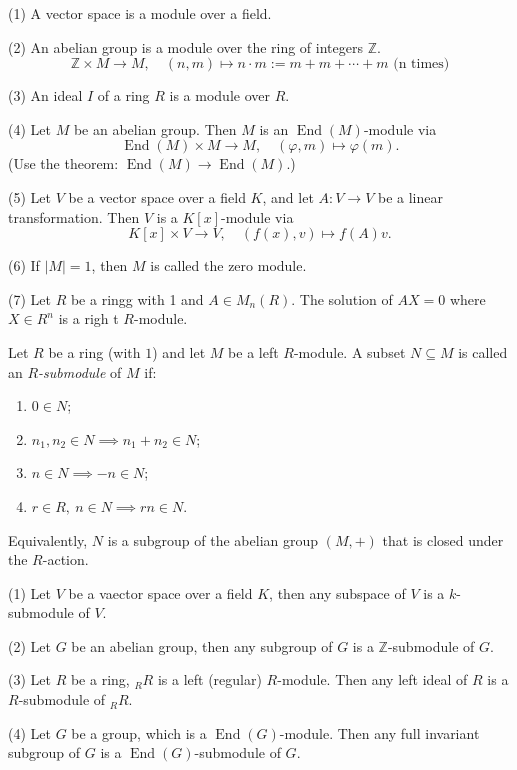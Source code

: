 \documentclass[11pt, a4paper]{report}
\begin{document}
\begin{example}
(1) A vector space is a module over a field.

(2) An abelian group is a module over the ring of integers $\mathbb{Z}$.
\[
\mathbb{Z} \times M \rightarrow M, \quad (n, m) \mapsto n \cdot m := m+m+\cdots+m \text{ (n times)}
\]

(3) An ideal $ I $ of a ring $ R $ is a module over $ R $.

(4) Let $M$ be an abelian group. Then $M$ is an $\operatorname{End}(M)$-module via
\[
\operatorname{End}(M) \times M \rightarrow M, \quad (\varphi, m) \mapsto \varphi(m).
\]
(Use the theorem: $\operatorname{End}(M) \rightarrow \operatorname{End}(M)$.)

(5) Let $V$ be a vector space over a field $K$, and let $A: V \rightarrow V$ be a linear transformation. Then $V$ is a $K[x]$-module via
\[
K[x] \times V \rightarrow V, \quad (f(x), v) \mapsto f(A)v.
\]

(6) If $|M| = 1$, then $M$ is called the zero module.

(7) Let $ R $ be a ringg with 1 and $ A \in M_n(R) $. The solution of $ AX=0 $ where $ X \in R^n $ is a righ t $ R $-module.   
\end{example}

\begin{definition}[$R$-submodule]
Let $R$ be a ring (with $1$) and let $M$ be a left $R$-module. A subset $N\subseteq M$
is called an \emph{$R$-submodule} of $M$ if:
\begin{enumerate}
  \item $0\in N$;
  \item $n_1,n_2\in N \implies n_1+n_2\in N$;
  \item $n\in N \implies -n\in N$;
  \item $r\in R,\ n\in N \implies rn\in N$.
\end{enumerate}
Equivalently, $N$ is a subgroup of the abelian group $(M,+)$ that is closed under the
$R$-action.
\end{definition}

\begin{example} 
(1) Let $ V $ be a vaector space over a field $ K $, then any subspace of $ V $ is a $ k $-submodule of $ V $.

(2) Let $ G $ be an abelian group, then any subgroup of $ G $ is a $ \mathbb{Z} $-submodule of $ G $.

(3) Let $ R $ be a ring, $ {}_RR $ is a left (regular) $ R $-module. Then any left ideal of $ R $ is a $ R $-submodule of $ {}_RR $.

(4) Let $ G $ be a group, which is a $ \operatorname{End}(G) $-module. Then any full invariant subgroup of $ G $ is a $ \operatorname{End}(G) $-submodule of $ G $.
\end{example}
\end{document}
